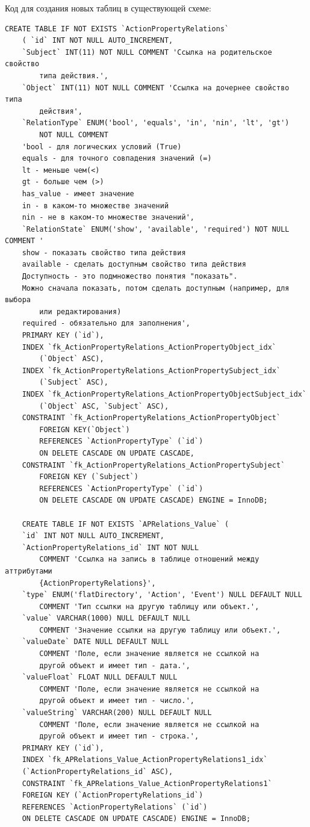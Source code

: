 \documentclass[a4paper,8pt]{report} %
\begin{document}
{    Код для создания новых таблиц в существующей схеме:
\begin{verbatim}
CREATE TABLE IF NOT EXISTS `ActionPropertyRelations`
    ( `id` INT NOT NULL AUTO_INCREMENT,
    `Subject` INT(11) NOT NULL COMMENT 'Ссылка на родительское свойство
        типа действия.',
    `Object` INT(11) NOT NULL COMMENT 'Ссылка на дочернее свойство типа
        действия',
    `RelationType` ENUM('bool', 'equals', 'in', 'nin', 'lt', 'gt')
        NOT NULL COMMENT
    'bool - для логических условий (True)
    equals - для точного совпадения значений (=)
    lt - меньше чем(<)
    gt - больше чем (>)
    has_value - имеет значение
    in - в каком-то множестве значений
    nin - не в каком-то множестве значений',
    `RelationState` ENUM('show', 'available', 'required') NOT NULL COMMENT '
    show - показать свойство типа действия
    available - сделать доступным свойство типа действия
    Доступность - это подмножество понятия "показать".
    Можно сначала показать, потом сделать доступным (например, для выбора
        или редактирования)
    required - обязательно для заполнения',
    PRIMARY KEY (`id`),
    INDEX `fk_ActionPropertyRelations_ActionPropertyObject_idx`
        (`Object` ASC),
    INDEX `fk_ActionPropertyRelations_ActionPropertySubject_idx`
        (`Subject` ASC),
    INDEX `fk_ActionPropertyRelations_ActionPropertyObjectSubject_idx`
        (`Object` ASC, `Subject` ASC),
    CONSTRAINT `fk_ActionPropertyRelations_ActionPropertyObject`
        FOREIGN KEY(`Object`)
        REFERENCES `ActionPropertyType` (`id`)
        ON DELETE CASCADE ON UPDATE CASCADE,
    CONSTRAINT `fk_ActionPropertyRelations_ActionPropertySubject`
        FOREIGN KEY (`Subject`)
        REFERENCES `ActionPropertyType` (`id`)
        ON DELETE CASCADE ON UPDATE CASCADE) ENGINE = InnoDB;

    CREATE TABLE IF NOT EXISTS `APRelations_Value` (
    `id` INT NOT NULL AUTO_INCREMENT,
    `ActionPropertyRelations_id` INT NOT NULL
        COMMENT 'Ссылка на запись в таблице отношений между аттрибутами
        {ActionPropertyRelations}',
    `type` ENUM('flatDirectory', 'Action', 'Event') NULL DEFAULT NULL
        COMMENT 'Тип ссылки на другую таблицу или объект.',
    `value` VARCHAR(1000) NULL DEFAULT NULL
        COMMENT 'Значение ссылки на другую таблицу или объект.',
    `valueDate` DATE NULL DEFAULT NULL
        COMMENT 'Поле, если значение является не ссылкой на
        другой объект и имеет тип - дата.',
    `valueFloat` FLOAT NULL DEFAULT NULL
        COMMENT 'Поле, если значение является не ссылкой на
        другой объект и имеет тип - число.',
    `valueString` VARCHAR(200) NULL DEFAULT NULL
        COMMENT 'Поле, если значение является не ссылкой на
        другой объект и имеет тип - строка.',
    PRIMARY KEY (`id`),
    INDEX `fk_APRelations_Value_ActionPropertyRelations1_idx`
    (`ActionPropertyRelations_id` ASC),
    CONSTRAINT `fk_APRelations_Value_ActionPropertyRelations1`
    FOREIGN KEY (`ActionPropertyRelations_id`)
    REFERENCES `ActionPropertyRelations` (`id`)
    ON DELETE CASCADE ON UPDATE CASCADE) ENGINE = InnoDB;
\end{verbatim}

}
\end{document}
